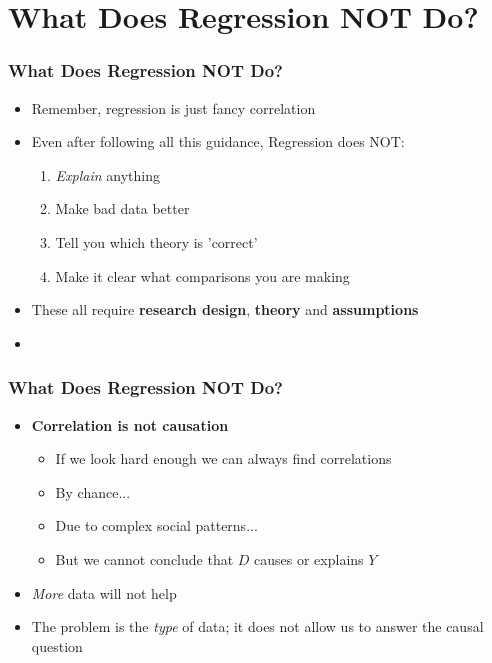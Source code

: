\documentclass[xcolor=x11names,compress]{beamer}\usepackage[]{graphicx}\usepackage[]{color}
\newenvironment{knitrout}{}{} %
\renewcommand{\(}{\begin{columns}}
\renewcommand{\)}{\end{columns}}
\newcommand{\<}[1]{\begin{column}{#1}}
\renewcommand{\>}{\end{column}}
\begin{document}
\begin{frame}
\begin{multicols}{2}
\begin{knitrout}
\end{knitrout}
\end{multicols}
\end{frame}

\section{What Does Regression NOT Do?}

\begin{frame}
\frametitle{What Does Regression NOT Do?}
\begin{itemize}
\item Remember, regression is just fancy correlation
\pause
\item Even after following all this guidance, Regression does NOT:
\begin{enumerate}
\item \textit{Explain} anything
\item Make bad data better
\item Tell you which theory is 'correct'
\item Make it clear what comparisons you are making
\end{enumerate}
\pause
\item These all require \textbf{research design}, \textbf{theory} and \textbf{assumptions}
\pause
\item 
\end{itemize}
\end{frame}

\begin{frame}
\frametitle{What Does Regression NOT Do?}
\begin{itemize}
\item \textbf{Correlation is not causation}
\pause
\begin{itemize}
\item If we look hard enough we can always find correlations
\pause
\item By chance...
\pause
\item Due to complex social patterns...
\pause
\item But we cannot conclude that $D$ causes or explains $Y$
\pause
\end{itemize}
\item \textit{More} data will not help
\pause
\item The problem is the \textit{type} of data; it does not allow us to answer the causal question 
\end{itemize}
\end{frame}
\end{document}
